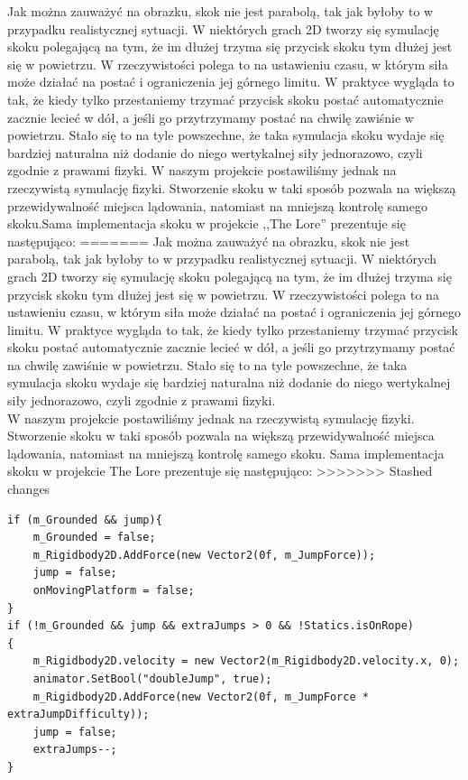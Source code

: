 \documentclass[oneside,polski,logo]{amuthesis}
\begin{document}
Jak można zauważyć na obrazku, skok nie jest parabolą, tak jak byłoby to w przypadku realistycznej sytuacji. W niektórych grach 2D tworzy się symulację skoku polegającą na tym, że im dłużej trzyma się przycisk skoku tym dłużej jest się w powietrzu. W rzeczywistości polega to na ustawieniu czasu, w którym siła może działać na postać i ograniczenia jej górnego limitu. W praktyce wygląda to tak, że kiedy tylko przestaniemy trzymać przycisk skoku postać automatycznie zacznie lecieć w dół, a jeśli go przytrzymamy postać na chwilę zawiśnie w powietrzu. Stało się to na tyle powszechne, że taka symulacja skoku wydaje się bardziej naturalna niż dodanie do niego wertykalnej siły jednorazowo, czyli zgodnie z prawami fizyki.  W naszym projekcie postawiliśmy jednak na rzeczywistą symulację fizyki. Stworzenie skoku w taki sposób pozwala na większą przewidywalność miejsca lądowania, natomiast na mniejszą kontrolę samego skoku.Sama implementacja skoku w projekcie ,,The Lore'' prezentuje się następująco:
=======
\newpage
Jak można zauważyć na obrazku, skok nie jest parabolą, tak jak byłoby to w przypadku realistycznej sytuacji. W niektórych grach 2D tworzy się symulację skoku polegającą na tym, że im dłużej trzyma się przycisk skoku tym dłużej jest się w powietrzu. W rzeczywistości polega to na ustawieniu czasu, w którym siła może działać na postać i ograniczenia jej górnego limitu. W praktyce wygląda to tak, że kiedy tylko przestaniemy trzymać przycisk skoku postać automatycznie zacznie lecieć w dół, a jeśli go przytrzymamy postać na chwilę zawiśnie w powietrzu. Stało się to na tyle powszechne, że taka symulacja skoku wydaje się bardziej naturalna niż dodanie do niego wertykalnej siły jednorazowo, czyli zgodnie z prawami fizyki. \cite{jumping2} \\ W naszym projekcie postawiliśmy jednak na rzeczywistą symulację fizyki. Stworzenie skoku w taki sposób pozwala na większą przewidywalność miejsca lądowania, natomiast na mniejszą kontrolę samego skoku. Sama implementacja skoku w projekcie The Lore prezentuje się następująco:
>>>>>>> Stashed changes

\begin{lstlisting}[breaklines=true,
language={[Sharp]C},
rulecolor=\color{blue!80!black},
caption={Fragment klasy \texttt{CharacterController.cs}}
]
if (m_Grounded && jump){
	m_Grounded = false;
	m_Rigidbody2D.AddForce(new Vector2(0f, m_JumpForce));
	jump = false;
	onMovingPlatform = false;
}
if (!m_Grounded && jump && extraJumps > 0 && !Statics.isOnRope)
{
	m_Rigidbody2D.velocity = new Vector2(m_Rigidbody2D.velocity.x, 0);
	animator.SetBool("doubleJump", true);
	m_Rigidbody2D.AddForce(new Vector2(0f, m_JumpForce * extraJumpDifficulty));
	jump = false;
	extraJumps--;
}
\end{lstlisting}
\end{document}
